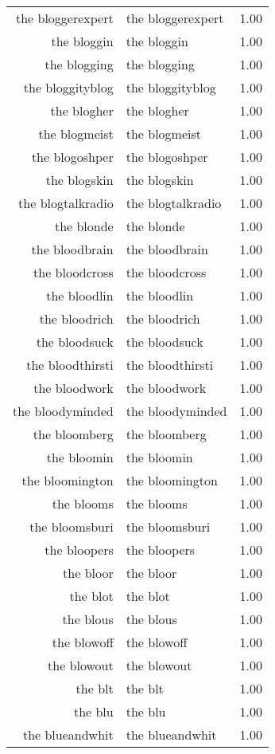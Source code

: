 \begin{table}[ht]
\begin{tabular}{rlr}
  the bloggerexpert & the bloggerexpert & 1.00 \\ 
  the bloggin & the bloggin & 1.00 \\ 
  the blogging & the blogging & 1.00 \\ 
  the bloggityblog & the bloggityblog & 1.00 \\ 
  the blogher & the blogher & 1.00 \\ 
  the blogmeist & the blogmeist & 1.00 \\ 
  the blogoshper & the blogoshper & 1.00 \\ 
  the blogskin & the blogskin & 1.00 \\ 
  the blogtalkradio & the blogtalkradio & 1.00 \\ 
  the blonde & the blonde & 1.00 \\ 
  the bloodbrain & the bloodbrain & 1.00 \\ 
  the bloodcross & the bloodcross & 1.00 \\ 
  the bloodlin & the bloodlin & 1.00 \\ 
  the bloodrich & the bloodrich & 1.00 \\ 
  the bloodsuck & the bloodsuck & 1.00 \\ 
  the bloodthirsti & the bloodthirsti & 1.00 \\ 
  the bloodwork & the bloodwork & 1.00 \\ 
  the bloodyminded & the bloodyminded & 1.00 \\ 
  the bloomberg & the bloomberg & 1.00 \\ 
  the bloomin & the bloomin & 1.00 \\ 
  the bloomington & the bloomington & 1.00 \\ 
  the blooms & the blooms & 1.00 \\ 
  the bloomsburi & the bloomsburi & 1.00 \\ 
  the bloopers & the bloopers & 1.00 \\ 
  the bloor & the bloor & 1.00 \\ 
  the blot & the blot & 1.00 \\ 
  the blous & the blous & 1.00 \\ 
  the blowoff & the blowoff & 1.00 \\ 
  the blowout & the blowout & 1.00 \\ 
  the blt & the blt & 1.00 \\ 
  the blu & the blu & 1.00 \\ 
  the blueandwhit & the blueandwhit & 1.00 \\ 

\end{tabular}
\end{table}
